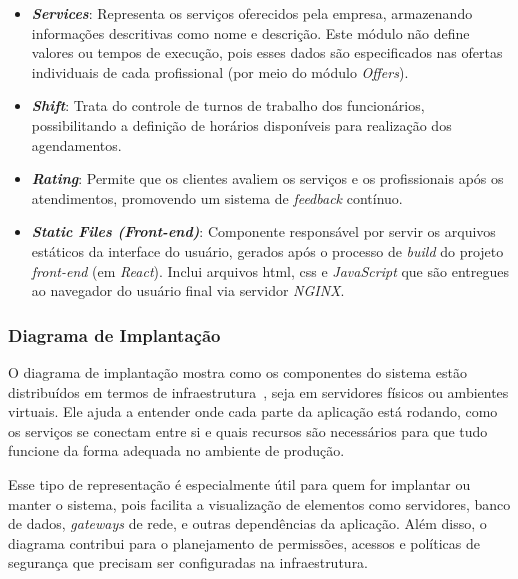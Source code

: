 \begin{itemize}
  \item \textbf{\emph{Services}}: Representa os serviços oferecidos pela empresa, armazenando informações descritivas como nome e descrição. Este módulo não define valores ou tempos de execução, pois esses dados são especificados nas ofertas individuais de cada profissional (por meio do módulo \textit{Offers}).

  \item \textbf{\emph{Shift}}: Trata do controle de turnos de trabalho dos funcionários, possibilitando a definição de horários disponíveis para realização dos agendamentos.

  \item \textbf{\emph{Rating}}: Permite que os clientes avaliem os serviços e os profissionais após os atendimentos, promovendo um sistema de \emph{feedback} contínuo.
  
  \item \textbf{\emph{Static Files (Front-end)}}: Componente responsável por servir os arquivos estáticos da interface do usuário, gerados após o processo de \textit{build} do projeto \emph{front-end} (em \emph{React}). Inclui arquivos \gls{html}, \gls{css} e \emph{JavaScript} que são entregues ao navegador do usuário final via servidor \emph{NGINX}.
\end{itemize}

\subsubsection{Diagrama de Implantação}

O diagrama de implantação mostra como os componentes do sistema estão distribuídos em termos de infraestrutura~\cite{Booch2005}, seja em servidores físicos ou ambientes virtuais. Ele ajuda a entender onde cada parte da aplicação está rodando, como os serviços se conectam entre si e quais recursos são necessários para que tudo funcione da forma adequada no ambiente de produção.

Esse tipo de representação é especialmente útil para quem for implantar ou manter o sistema, pois facilita a visualização de elementos como servidores, banco de dados, \emph{gateways} de rede, e outras dependências da aplicação. Além disso, o diagrama contribui para o planejamento de permissões, acessos e políticas de segurança que precisam ser configuradas na infraestrutura.

